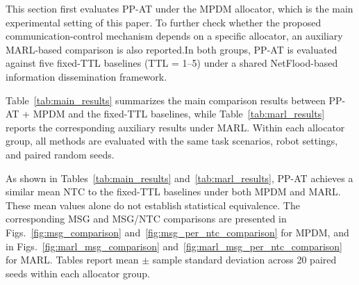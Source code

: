 \documentclass[type=submission,name=IR]{oae}
\begin{document}
This section first evaluates PP-AT under the MPDM allocator, which is the main experimental setting of this paper. To further check whether the proposed communication-control mechanism depends on a specific allocator, an auxiliary MARL-based comparison is also reported.In both groups, PP-AT is evaluated against five fixed-TTL baselines (TTL = 1–5) under a shared NetFlood-based information dissemination framework.

Table~\ref{tab:main_results} summarizes the main comparison results between PP-AT + MPDM and the fixed-TTL baselines, while Table~\ref{tab:marl_results} reports the corresponding auxiliary results under MARL. Within each allocator group, all methods are evaluated with the same task scenarios, robot settings, and paired random seeds.

\begin{table}[htb]
\centering
\caption{Main Comparison Results Under MPDM}
\label{tab:main_results}
\end{table}

As shown in Tables~\ref{tab:main_results} and~\ref{tab:marl_results}, PP-AT achieves a similar mean NTC to the fixed-TTL baselines under both MPDM and MARL. These mean values alone do not establish statistical equivalence. The corresponding MSG and MSG/NTC comparisons are presented in Figs.~\ref{fig:msg_comparison} and~\ref{fig:msg_per_ntc_comparison} for MPDM, and in Figs.~\ref{fig:marl_msg_comparison} and~\ref{fig:marl_msg_per_ntc_comparison} for MARL. Tables report mean $\pm$ sample standard deviation across 20 paired seeds within each allocator group.
\end{document}

